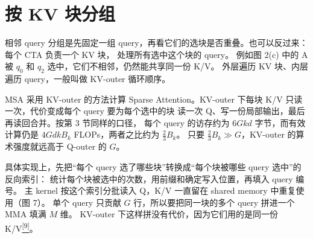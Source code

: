 \section{按 KV 块分组}

相邻 query 分组是先固定一组 query，再看它们的选块是否重叠。也可以反过来：每个 CTA 负责一个 KV 块， 处理所有选中这个块的 query。 例如图 2(c) 中的 A 被 $q_0$ 和 $q_2$ 选中，它们不相邻，仍然能共享同一份 K/V。 外层遍历 KV 块、内层遍历 query，一般叫做 KV-outer 循环顺序。

MSA 采用 KV-outer 的方法计算 Sparse Attention。KV-outer 下每块 K/V 只读一次，代价变成每个 query 要为每个选中的块 读一次 Q、写一份局部输出，最后再读回合并。按第 3 节同样的口径， 每个 query 的访存约为 $6Gkd$ 字节，而有效计算仍是 $4GdkB_k$ FLOPs，两者之比约为 $\tfrac{2}{3}B_k$。 只要 $\tfrac{2}{3}B_k \gg G$，KV-outer 的算术强度就远高于 Q-outer 的 $G$。

具体实现上，先把“每个 query 选了哪些块”转换成“每个块被哪些 query 选中”的反向索引： 统计每个块被选中的次数，用前缀和确定写入位置，再填入 query 编号。 主 kernel 按这个索引分批读入 Q，K/V 一直留在 shared memory 中重复使用（图 7）。 单个 query 只贡献 $G$ 行，所以要把同一块的多个 query 拼进一个 MMA 填满 $M$ 维。 KV-outer 下这样拼没有代价，因为它们用的是同一份 K/V\hyperlink{ref-9}{\textsuperscript{[9]}}。

